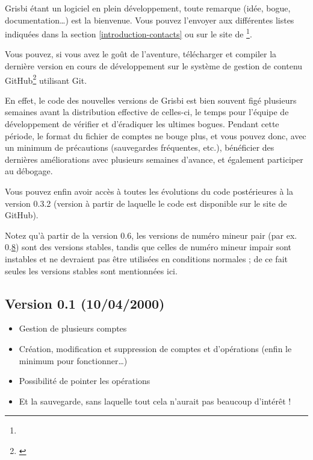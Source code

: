 Grisbi étant un logiciel en plein développement, toute remarque (idée, bogue, documentation\dots{}) est la bienvenue. Vous pouvez l'envoyer aux différentes listes indiquées dans la section \vref{introduction-contacts}  ou sur le site de \footnote{\urlGrisbi{}}.

Vous pouvez, si vous avez le goût de l'aventure, télécharger et compiler la dernière version en cours de développement sur le système de gestion de contenu \gls{GitHub}\footnote{\urlGitHubGrisbi{}\label{siteGitHubGrisbi}} utilisant \gls{Git}.

En effet, le code des nouvelles versions de Grisbi est bien souvent figé plusieurs semaines avant la distribution effective de celles-ci, le temps pour l'équipe de développement de vérifier et d'éradiquer les ultimes bogues. Pendant cette période, le format du fichier de comptes ne bouge plus, et vous pouvez donc, avec un minimum de précautions (sauvegardes fréquentes, etc.), bénéficier des dernières améliorations avec plusieurs semaines d'avance, et également participer au débogage.

Vous pouvez enfin avoir accès à toutes les évolutions du code postérieures à la version 0.3.2 (version à partir de laquelle le code est disponible sur le site de \gls{GitHub}).

Notez qu'à partir de la version 0.6, les versions de numéro mineur pair (par ex. 0.\underline8) sont des versions stables, tandis que celles de numéro mineur impair sont instables et ne devraient pas être utilisées en conditions normales ; de ce fait seules les versions stables sont mentionnées ici.

\newpage

\subsection{Version 0.1 \textnormal{(10/04/2000)}}

\begin{itemize}
	\item Gestion de plusieurs comptes
	\item Création, modification et suppression de comptes et d'opérations (enfin le minimum pour fonctionner\dots{})
	\item Possibilité de pointer les opérations
	\item Et la sauvegarde, sans laquelle tout cela n'aurait pas beaucoup d'intérêt !
\end{itemize}

